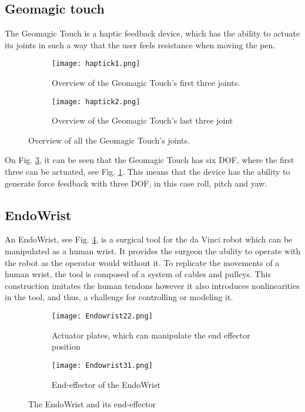 
\subsection{Geomagic touch}\label{sec:Geomagic_touch}
The Geomagic Touch is a haptic feedback device, which has the ability to actuate its joints in such a way that the user feels resistance when moving the pen. 


\begin{figure}[h]
  \centering
  \begin{subfigure}{.22\textwidth}
    \centering
    \texttt{[image: haptick1.png]}
    \caption{Overview of the Geomagic Touch's first three joints.}
    \label{fig:phantom1}
  \end{subfigure}
  \begin{subfigure}{.22\textwidth}
    \centering
    \texttt{[image: haptick2.png]}
    \caption{Overview of the Geomagic Touch's last three joint}
    \label{fig:phantom2}
  \end{subfigure}
\caption{Overview of all the Geomagic Touch's joints.}
\label{fig:phantom_omni}
\end{figure}


On Fig. \ref{fig:phantom_omni}, it can be seen that the Geomagic Touch has six DOF, where the first three can be actuated, see Fig. \ref{fig:phantom1}. This means that the device has the ability to generate force feedback with three DOF, in this case roll, pitch and yaw.



    
\subsection{EndoWrist}\label{sec:EndoWrist}

An EndoWrist, see Fig. \ref{fig:Endo_plates}, is a surgical tool for the da Vinci robot which can be manipulated as a human wrist. It provides the surgeon the ability to operate with the robot as the operator would without it. To replicate the movements of a human wrist, the tool is composed of a system of cables and pulleys. This construction imitates the human tendons however it also introduces nonlinearities in the tool, and thus, a challenge for controlling or modeling it.

\begin{figure}[h]
  \centering
  \begin{subfigure}{.22\textwidth}
    \centering
    \texttt{[image: Endowrist22.png]}
    \caption{Actuator plates, which can manipulate the end effector position}
    \label{fig:Endo_plates}
  \end{subfigure}
  \begin{subfigure}{.22\textwidth}
    \centering
    \texttt{[image: Endowrist31.png]}
    \caption{End-effector of the EndoWrist\newline}
    \label{fig:Endo_end}
  \end{subfigure}
\caption{The EndoWrist and its end-effector}
\label{fig:endowrits_set}
\end{figure}


